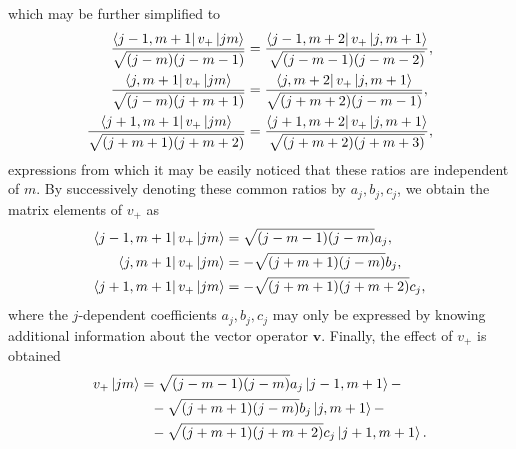\documentclass[12pt,a4paper]{report}
\theoremstyle{definition}
\theoremstyle{remark}
\theoremstyle{remark}
\begin{document}
which may be further simplified to
\begin{align*}
\frac{\bra{j-1,m+1}v_+\ket{jm}}{\sqrt{(j-m)(j-m-1)}}&=\frac{\bra{j-1,m+2}v_+\ket{j,m+1}}{\sqrt{(j-m-1)(j-m-2)}},\\
\frac{\bra{j,m+1}v_+\ket{jm}}{\sqrt{(j-m)(j+m+1)}}&=\frac{\bra{j,m+2}v_+\ket{j,m+1}}{\sqrt{(j+m+2)(j-m-1)}},\\
\frac{\bra{j+1,m+1}v_+\ket{jm}}{\sqrt{(j+m+1)(j+m+2)}}&=\frac{\bra{j+1,m+2}v_+\ket{j,m+1}}{\sqrt{(j+m+2)(j+m+3)}},
\end{align*}
expressions from which it may be easily noticed that these ratios are independent of $m$. By successively denoting these common ratios by $a_j,b_j,c_j$, we obtain the matrix elements of $v_+$ as
\begin{equation}\label{eso3.20}
\begin{aligned}
\bra{j-1,m+1}v_+\ket{jm}&=\sqrt{(j-m-1)(j-m)}a_j,\\
\bra{j,m+1}v_+\ket{jm}&=-\sqrt{(j+m+1)(j-m)}b_j,\\
\bra{j+1,m+1}v_+\ket{jm}&=-\sqrt{(j+m+1)(j+m+2)}c_j,
\end{aligned}
\end{equation}
where the $j$-dependent coefficients $a_j,b_j,c_j$ may only be expressed by knowing additional information about the vector operator $\mathbf{v}$. 
Finally, the effect of $v_+$ is obtained
\begin{equation}\label{eso3.17}
\begin{aligned}
v_+\ket{jm}&=\sqrt{(j-m-1)(j-m)}a_j\ket{j-1,m+1}-\\
&\phantom{=}-\sqrt{(j+m+1)(j-m)}b_j\ket{j,m+1}-\\
&\phantom{=}-\sqrt{(j+m+1)(j+m+2)}c_j\ket{j+1,m+1}.
\end{aligned}
\end{equation}
\end{document}
